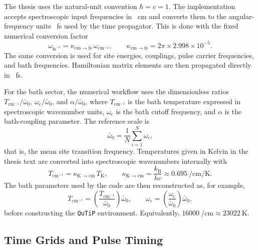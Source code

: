 The thesis uses the natural-unit convention \(\hbar=c=1\). The
implementation accepts spectroscopic input frequencies in
\si{\per\centi\metre} and converts them to the angular-frequency units
\si{\per\femto\second} used by the time propagator. This is done with the
fixed numerical conversion factor
\begin{equation*}
\omega_{\mathrm{fs}^{-1}}
=
\kappa_{\mathrm{cm}\to\mathrm{fs}}\,\omega_{\mathrm{cm}^{-1}},
\qquad
\kappa_{\mathrm{cm}\to\mathrm{fs}}
=
2\pi \times 2.998\times10^{-5}.
\end{equation*}
The same conversion is used for site energies, couplings, pulse carrier
frequencies, and bath frequencies. Hamiltonian matrix elements are then
propagated directly in \si{\per\femto\second}.

For the bath sector, the numerical workflow uses the dimensionless ratios
\(T_{\mathrm{cm}^{-1}}/\bar{\omega}_0\),
\(\omega_{\mathrm{c}}/\bar{\omega}_0\), and
\(\alpha/\bar{\omega}_0\), where \(T_{\mathrm{cm}^{-1}}\) is the bath
temperature expressed in spectroscopic wavenumber units,
\(\omega_{\mathrm{c}}\) is the bath cutoff frequency, and \(\alpha\) is the
bath-coupling parameter. The reference scale is
\begin{equation}
\bar{\omega}_0
=
\frac{1}{N}\sum_{i=1}^{N}\omega_i,
\label{eq:app_characteristic_optical_scale}
\end{equation}
that is, the mean site transition frequency. Temperatures given in
Kelvin in the thesis text are converted into spectroscopic
wavenumbers internally with
\begin{equation*}
T_{\mathrm{cm}^{-1}}
=
\kappa_{\mathrm{K}\to\mathrm{cm}}\,T_{\mathrm{K}},
\qquad
\kappa_{\mathrm{K}\to\mathrm{cm}}
=
\frac{k_{\mathrm{B}}}{hc}
\approx
0.695~\si{\per\centi\metre\per\kelvin}.
\end{equation*}
The bath parameters used by the code are then reconstructed as, for example,
\begin{equation*}
T_{\mathrm{cm}^{-1}}
=
\left(\frac{T_{\mathrm{cm}^{-1}}}{\bar{\omega}_0}\right)\bar{\omega}_0,
\qquad
\omega_{\mathrm{c}} = \left(\frac{\omega_{\mathrm{c}}}{\bar{\omega}_0}\right)\bar{\omega}_0,
\end{equation*}
before constructing the \texttt{QuTiP} environment.
Equivalently, \(\SI{16000}{\per\centi\metre}\approx\SI{23022}{\kelvin}\).

\subsection{Time Grids and Pulse Timing}

